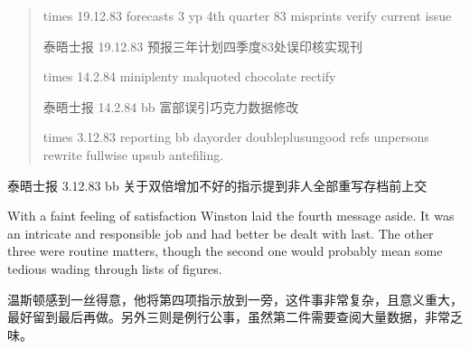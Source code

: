 \begin{paracol}{2}
\begin{quotation}
\switchcolumn*

times 19.12.83 forecasts 3 yp 4th quarter 83 misprints verify current
issue

\switchcolumn

泰晤士报 19.12.83 预报三年计划四季度83处误印核实现刊

\switchcolumn*

times 14.2.84 miniplenty malquoted chocolate rectify

\switchcolumn

泰晤士报 14.2.84 bb 富部误引巧克力数据修改

\switchcolumn*

times 3.12.83 reporting bb dayorder doubleplusungood refs unpersons
rewrite fullwise upsub antefiling.
\end{quotation}

\switchcolumn

泰晤士报 3.12.83 bb 关于双倍增加不好的指示提到非人全部重写存档前上交

\switchcolumn*

With a faint feeling of satisfaction Winston laid the fourth message
aside. It was an intricate and responsible job and had better be dealt
with last. The other three were routine matters, though the second one
would probably mean some tedious wading through lists of figures.

\switchcolumn

温斯顿感到一丝得意，他将第四项指示放到一旁，这件事非常复杂，且意义重大，最好留到最后再做。另外三则是例行公事，虽然第二件需要查阅大量数据，非常乏味。

\switchcolumn*


\end{paracol}
